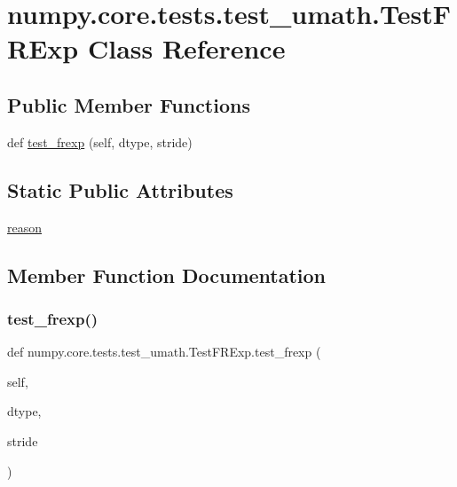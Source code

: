 \hypertarget{classnumpy_1_1core_1_1tests_1_1test__umath_1_1TestFRExp}{}\section{numpy.\+core.\+tests.\+test\+\_\+umath.\+Test\+F\+R\+Exp Class Reference}
\label{classnumpy_1_1core_1_1tests_1_1test__umath_1_1TestFRExp}
\subsection*{Public Member Functions}
\begin{DoxyCompactItemize}
\item 
def \hyperlink{classnumpy_1_1core_1_1tests_1_1test__umath_1_1TestFRExp_a8cf2ca712fa0998d9bf920868bd11512}{test\+\_\+frexp} (self, dtype, stride)
\end{DoxyCompactItemize}
\subsection*{Static Public Attributes}
\begin{DoxyCompactItemize}
\item 
\hyperlink{classnumpy_1_1core_1_1tests_1_1test__umath_1_1TestFRExp_a766d376201ea79b163d84ee8f3152e67}{reason}
\end{DoxyCompactItemize}


\subsection{Member Function Documentation}
\mbox{\label{classnumpy_1_1core_1_1tests_1_1test__umath_1_1TestFRExp_a8cf2ca712fa0998d9bf920868bd11512}} 
\subsubsection{\texorpdfstring{test\+\_\+frexp()}{test\_frexp()}}
{\footnotesize\ttfamily def numpy.\+core.\+tests.\+test\+\_\+umath.\+Test\+F\+R\+Exp.\+test\+\_\+frexp (\begin{DoxyParamCaption}\item[{}]{self,  }\item[{}]{dtype,  }\item[{}]{stride }\end{DoxyParamCaption})}



